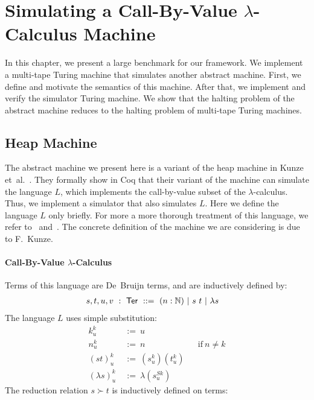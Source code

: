\chapter{Simulating a Call-By-Value $\lambda$-Calculus Machine}
\label{chap:heap}

\newcommand{\subst}[3]{{#1}^{#2}_{#3}}
\newcommand{\Ter}{\MS{Ter}}
\newcommand{\red}{\succ}


In this chapter, we present a large benchmark for our framework.  We implement a multi-tape Turing machine that simulates another abstract machine.
First, we define and motivate the semantics of this machine.  After that, we implement and verify the simulator Turing machine.  We show that the
halting problem of the abstract machine reduces to the halting problem of multi-tape Turing machines.

\section{Heap Machine}
\label{sec:heap}

The abstract machine we present here is a variant of the heap machine in Kunze et~al.~\cite{KunzeEtAl:2018:Formal}.  They formally show in Coq that
their variant of the machine can simulate the language $L$, which implements the call-by-value subset of the $\lambda$-calculus.  Thus, we implement a
simulator that also simulates $L$.  Here we define the language $L$ only briefly.  For more a more thorough treatment of this language, we refer
to~\cite{forster2017weak} and~\cite{KunzeEtAl:2018:Formal}.  The concrete definition of the machine we are considering is due to F.~Kunze.


\subsubsection{Call-By-Value $\lambda$-Calculus}
\label{sec:L}

Terms of this language are De~Bruijn terms, and are inductively defined by:
\begin{align*}
  s,t,u,v &~:~\Ter~::=~ (n:\Nat) ~|~ s~t ~|~ \lambda s
\end{align*}
The language $L$ uses simple substitution:
\begin{align*}
  \subst kku &~:=~u \\
  \subst nku &~:=~n &&\text{if}~n\neq k \\
  \subst{(st)}ku &~:=~(\subst sku)(\subst tku) \\
  \subst{(\lambda s)}ku &~:=~\lambda(\subst s{Sk}u)
\end{align*}
The reduction relation $s \red t$ is inductively defined on terms:


